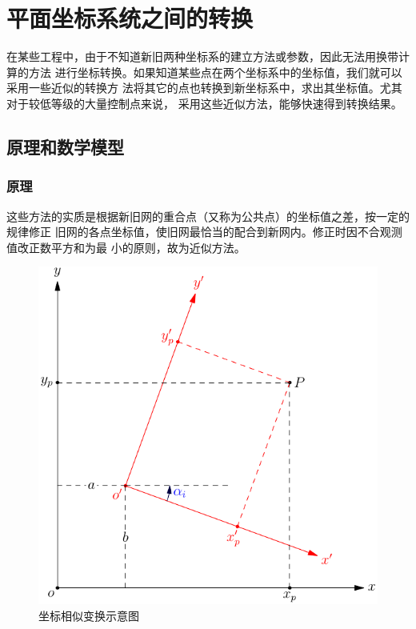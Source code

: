 
\chapter{平面坐标系统之间的转换}

在某些工程中，由于不知道新旧两种坐标系的建立方法或参数，因此无法用换带计算的方法
进行坐标转换。如果知道某些点在两个坐标系中的坐标值，我们就可以采用一些近似的转换方
法将其它的点也转换到新坐标系中，求出其坐标值。尤其对于较低等级的大量控制点来说，
采用这些近似方法，能够快速得到转换结果。

 \section{原理和数学模型}

\subsection{原理}
这些方法的实质是根据新旧网的重合点（又称为公共点）的坐标值之差，按一定的规律修正
旧网的各点坐标值，使旧网最恰当的配合到新网内。修正时因不合观测值改正数平方和为最
小的原则，故为近似方法。

\begin{figure}[htbp]
    \centering
    \includegraphics[scale=1]{chapter/xytoxy/xytoxy.pdf}
    \caption{坐标相似变换示意图}
    \label{fig:xytoxy}
\end{figure}

